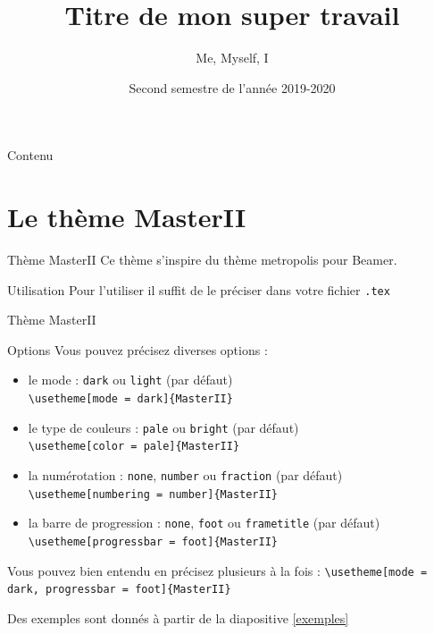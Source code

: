 \documentclass[french]{beamer}
\title{Titre de mon super travail}
\author{Me, Myself, I}
\date{Second semestre de l'année 2019-2020}
\begin{document}
  
  \maketitle
  
  \begin{frame}[noframenumbering]{Contenu}
    \tableofcontents
  \end{frame}
  
  \section{Le thème MasterII}
  
  \begin{frame}[fragile]{Thème MasterII}
    Ce thème s'inspire du thème metropolis pour Beamer.
    \begin{block}{Utilisation}
      Pour l'utiliser il suffit de le préciser dans votre fichier \verb:.tex:
    \end{block}
  \end{frame}
  
  \begin{frame}[fragile]{Thème MasterII}
    \begin{block}{Options}
      Vous pouvez précisez diverses options :
      \begin{itemize}
        \item le mode : \verb?dark? ou \verb!light! (par défaut)\\
            \verb::
        \item le type de couleurs : \verb?pale? ou \verb!bright! (par défaut)\\
            \verb::
        \item la numérotation : \verb?none?, \verb|number| ou \verb!fraction! (par défaut)\\
            \verb::
        \item la barre de progression : \verb?none?, \verb|foot| ou \verb!frametitle! (par défaut)\\
            \verb::
      \end{itemize}
      Vous pouvez bien entendu en précisez plusieurs à la fois : \verb::
      
      Des exemples sont donnés à partir de la diapositive \ref{exemples}
    \end{block}
  \end{frame}
    
\end{document}
